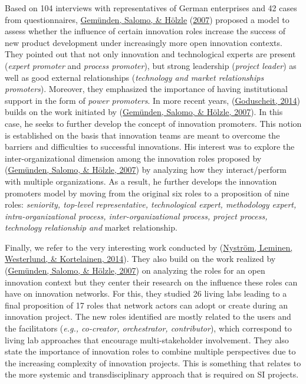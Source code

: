 \documentclass[]{elsarticle} %
\begin{document}
Based on 104 interviews with representatives of German enterprises and
42 cases from questionnaires,
\protect\hyperlink{ref-Gemunden2007}{Gemünden, Salomo, \& Hölzle}
(\protect\hyperlink{ref-Gemunden2007}{2007}) proposed a model to assess
whether the influence of certain innovation roles increase the success
of new product development under increasingly more open innovation
contexts. They pointed out that not only innovation and technological
experts are present (\emph{expert promoter} and \emph{process
promoter}), but strong leadership (\emph{project leader}) as well as
good external relationships (\emph{technology and market relationships
promoters}). Moreover, they emphasized the importance of having
institutional support in the form of \emph{power promoters}. In more
recent years, (\protect\hyperlink{ref-Goduscheit2014}{Goduscheit, 2014})
builds on the work initiated by
(\protect\hyperlink{ref-Gemunden2007}{Gemünden, Salomo, \& Hölzle,
2007}). In this case, he seeks to further develop the concept of
innovation promoters. This notion is established on the basis that
innovation teams are meant to overcome the barriers and difficulties to
successful innovations. His interest was to explore the
inter-organizational dimension among the innovation roles proposed by
(\protect\hyperlink{ref-Gemunden2007}{Gemünden, Salomo, \& Hölzle,
2007}) by analyzing how they interact/perform with multiple
organizations. As a result, he further develops the innovation promoters
model by moving from the original six roles to a proposition of nine
roles: \emph{seniority, top-level representative, technological expert,
methodology expert, intra-organizational process, inter-organizational
process, project process, technology relationship and} market
relationship.

Finally, we refer to the very interesting work conducted by
(\protect\hyperlink{ref-Nystrom2014}{Nyström, Leminen, Westerlund, \&
Kortelainen, 2014}). They also build on the work realized by
(\protect\hyperlink{ref-Gemunden2007}{Gemünden, Salomo, \& Hölzle,
2007}) on analyzing the roles for an open innovation context but they
center their research on the influence these roles can have on
innovation networks. For this, they studied 26 living labs leading to a
final proposition of 17 roles that network actors can adopt or create
during an innovation project. The new roles identified are mostly
related to the users and the facilitators (\emph{e.g., co-creator,
orchestrator, contributor}), which correspond to living lab approaches
that encourage multi-stakeholder involvement. They also state the
importance of innovation roles to combine multiple perspectives due to
the increasing complexity of innovation projects. This is something that
relates to the more systemic and transdisciplinary approach that is
required on SI projects.
\end{document}
